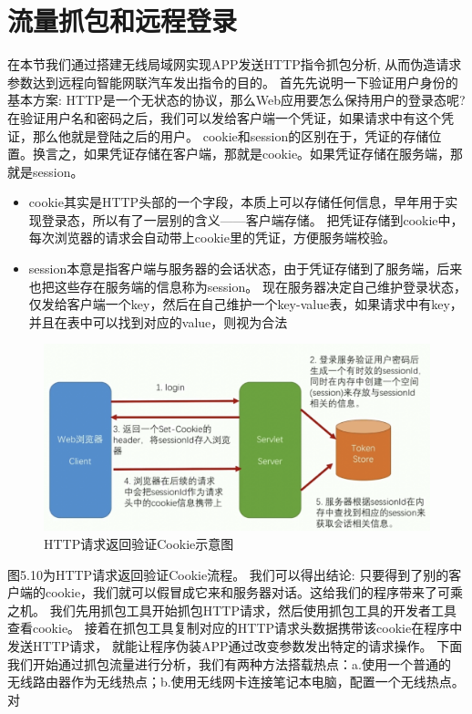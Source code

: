 \section{流量抓包和远程登录}
在本节我们通过搭建无线局域网实现APP发送HTTP指令抓包分析, 从而伪造请求参数达到远程向智能网联汽车发出指令的目的。
首先先说明一下验证用户身份的基本方案: HTTP是一个无状态的协议，那么Web应用要怎么保持用户的登录态呢?
在验证用户名和密码之后，我们可以发给客户端一个凭证，如果请求中有这个凭证，那么他就是登陆之后的用户。
cookie和session的区别在于，凭证的存储位置。换言之，如果凭证存储在客户端，那就是cookie。如果凭证存储在服务端，那就是session。
\begin{itemize}
  \item cookie其实是HTTP头部的一个字段，本质上可以存储任何信息，早年用于实现登录态，所以有了一层别的含义——客户端存储。
  把凭证存储到cookie中，每次浏览器的请求会自动带上cookie里的凭证，方便服务端校验。
  \item session本意是指客户端与服务器的会话状态，由于凭证存储到了服务端，后来也把这些存在服务端的信息称为session。
  现在服务器决定自己维护登录状态，仅发给客户端一个key，然后在自己维护一个key-value表，如果请求中有key，并且在表中可以找到对应的value，则视为合法
\end{itemize}
\begin{figure}
  \centering
  \includegraphics[scale=0.5]{resources/img/i25.png}
  \caption{HTTP请求返回验证Cookie示意图}
\end{figure} 
图5.10为HTTP请求返回验证Cookie流程。
我们可以得出结论:
只要得到了别的客户端的cookie，我们就可以假冒成它来和服务器对话。这给我们的程序带来了可乘之机。
我们先用抓包工具开始抓包HTTP请求，然后使用抓包工具的开发者工具查看cookie。
接着在抓包工具复制对应的HTTP请求头数据携带该cookie在程序中发送HTTP请求，
就能让程序伪装APP通过改变参数发出特定的请求操作。
\newline
下面我们开始通过抓包流量进行分析，我们有两种方法搭载热点：a.使用一个普通的
无线路由器作为无线热点；b.使用无线网卡连接笔记本电脑，配置一个无线热点。对
